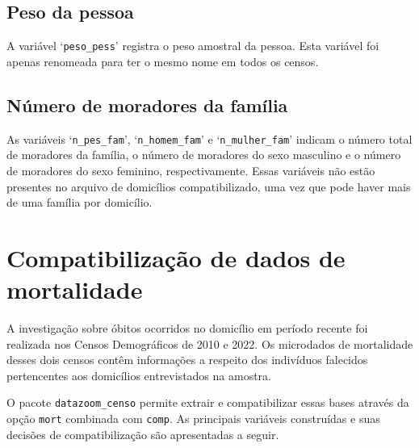 \documentclass[12pt,a4paper]{article}
\newcommand{\vr}[1]{\texttt{#1}}
\begin{document}
\subsection{Peso da pessoa}\label{sec:d12}
A variável ‘\vr{peso\_pess}’ registra o peso amostral da pessoa. Esta variável foi apenas renomeada para ter o mesmo nome em todos os censos.

\subsection{Número de moradores da família}\label{sec:d13}
As variáveis ‘\vr{n\_pes\_fam}’, ‘\vr{n\_homem\_fam}’ e ‘\vr{n\_mulher\_fam}’ indicam o número total de moradores da família, o número de moradores do sexo masculino e o número de moradores do sexo feminino, respectivamente. Essas variáveis não estão presentes no arquivo de domicílios compatibilizado, uma vez que pode haver mais de uma família por domicílio.

\section{Compatibilização de dados de mortalidade}

A investigação sobre óbitos ocorridos no domicílio em período recente foi realizada nos Censos Demográficos de 2010 e 2022. Os microdados de mortalidade desses dois censos contêm informações a respeito dos indivíduos falecidos pertencentes aos domicílios entrevistados na amostra.

O pacote \texttt{datazoom\_censo} permite extrair e compatibilizar essas bases através da opção \texttt{mort} combinada com \texttt{comp}. As principais variáveis construídas e suas decisões de compatibilização são apresentadas a seguir.
\end{document}
